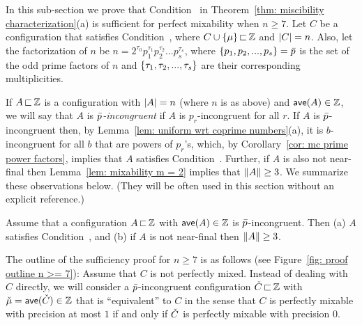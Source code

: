 


In this sub-section we prove that Condition~{\MixCond} in Theorem~\ref{thm: miscibility characterization}(a)
is sufficient for perfect mixability when $n\geq 7$. 
Let $C$ be a configuration that satisfies Condition~{\MixCond},
where  $C\cup { \left\{ \mu \right\} } {\,\sqsubset\,} {\mathbb Z}$ and ${|C|} = n$.  
Also, let the factorization of $n$ be $n = 2^{\tau_0}p_1^{\tau_1} p_2^{\tau_2} ... p_s^{\tau_s}$, 
where ${ \left\{ p_1,p_2,...,p_s \right\} } = {\bar{p}}$ is the set of 
the odd prime factors of $n$ and ${ \left\{ \tau_1,\tau_2,...,\tau_s \right\} }$ are their corresponding multiplicities.

If $A{\,\sqsubset\,}{\mathbb Z}$ is a configuration with ${|A|} = n$ 
(where $n$ is as above) and ${\textsf{ave}}(A)\in{\mathbb Z}$, 
we will say that $A$ is \emph{${\bar{p}}$-incongruent} if $A$ is $p_r$-incongruent for all $r$.
If $A$ is ${\bar{p}}$-incongruent then, by Lemma~\ref{lem: uniform wrt coprime numbers}(a),
it is $b$-incongruent for all $b$ that are powers of $p_r$'s, which,
by Corollary~\ref{cor: mc prime power factors}, implies that $A$ satisfies Condition~{\MixCond}.
Further, if $A$ is also not near-final
then Lemma~\ref{lem: mixability m = 2} implies that ${\|A\|}\ge 3$.
We summarize these observations below. (They will be often used in this section
without an explicit reference.)

\begin{observation}%
	\label{obs: A mod-nouniform properties}
	Assume that a configuration $A{\,\sqsubset\,} {\mathbb Z}$ with ${\textsf{ave}}(A)\in{\mathbb Z}$ is ${\bar{p}}$-incongruent.
	Then
	\textrm{(a)} $A$ satisfies Condition~{\MixCond}, and
	\textrm{(b)} if $A$ is not near-final then ${\|A\|}\ge 3$.
\end{observation}%


The outline of the sufficiency proof for $n\ge 7$ is as follows (see Figure~\ref{fig: proof outline n >= 7}):
Assume that $C$ is not perfectly mixed.
Instead of dealing with $C$ directly,
we will consider a ${\bar{p}}$-incongruent configuration ${\check{C}}{\,\sqsubset\,}{\mathbb Z}$ with ${\check{\mu}} = {\textsf{ave}}({\check{C}})\in{\mathbb Z}$
that is ``equivalent'' to $C$ in the sense
that $C$ is perfectly mixable with precision at most $1$ if and only if ${\check{C}}$ is perfectly mixable
with precision $0$. 

